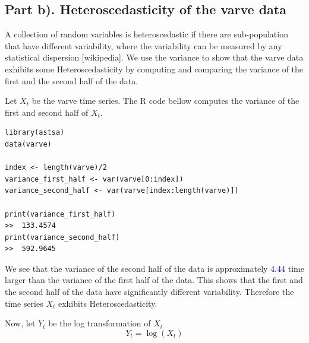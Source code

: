 \documentclass[11pt, oneside]{article}   	%
\begin{document}
\subsection{Part b). Heteroscedasticity of the varve data}
A collection of random variables is heteroscedastic if there are sub-population that have different variability, where the variability can be measured by any statistical dispersion [wikipedia]. We use the variance to show that the varve data exhibits some Heteroscedasticity by computing and comparing the variance of the first and the second half of the data. 
\begin{flushleft}
Let $X_{t}$ be the varve time series. The R code bellow computes the variance of the first and second half of $X_{t}$.
\end{flushleft}
\clearpage
\begin{lstlisting}
library(astsa)
data(varve)

index <- length(varve)/2
variance_first_half <- var(varve[0:index])
variance_second_half <- var(varve[index:length(varve)])

print(variance_first_half)
>>  133.4574
print(variance_second_half)
>>  592.9645
\end{lstlisting}
\begin{flushleft}
We see that the variance of the second half of the data is approximately \textcolor{blue}{4.44} time larger than the variance of the first half of the data. This shows that the first and the second half of the data have significantly different variability. Therefore the time series $X_{t}$ exhibits Heteroscedasticity.
\end{flushleft}

\begin{flushleft}
Now, let $Y_{t}$ be the log transformation of $X_{t}$
\begin{equation}
Y_{t} = \log(X_{t})
\end{equation}
\end{flushleft}
\end{document}
